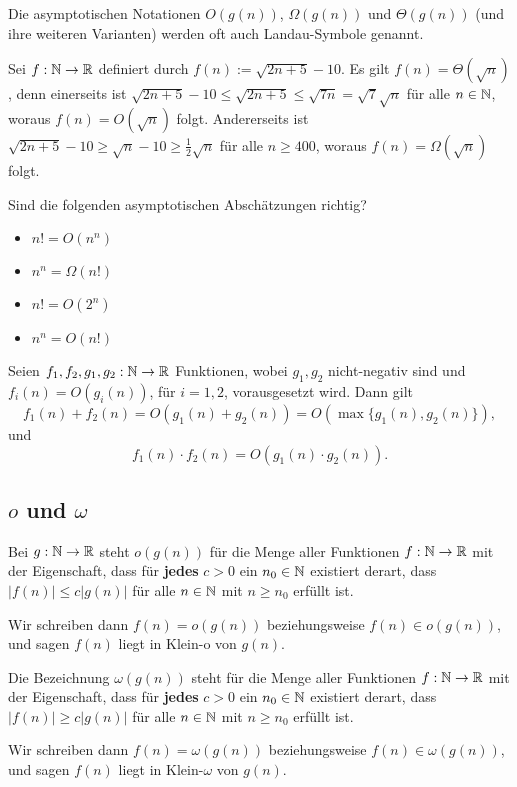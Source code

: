 \begin{bem}
Die asymptotischen Notationen $O(g(n))$, $\Omega(g(n))$ und $\Theta(g(n))$ (und ihre weiteren Varianten) werden oft auch Landau-Symbole genannt.
\end{bem} 

\begin{bsp}
	Sei $f : \mathbb{N} \to \mathbb{R}$ definiert durch $f(n):=\sqrt{2 n + 5 } - 10$. Es gilt $f(n) = \Theta(\sqrt{n})$, denn einerseits ist $\sqrt{2n + 5} - 10 \le \sqrt{2n + 5} \le \sqrt{ 7n} = \sqrt{7} \sqrt{n}$ für alle $n \in \mathbb{N}$, woraus $f(n) = O(\sqrt{n})$ folgt. Andererseits ist $\sqrt{2n + 5} - 10 \ge \sqrt{n} - 10 \ge \frac{1}{2} \sqrt{n}$ für alle $n \ge 400$, woraus $f(n) = \Omega(\sqrt{n})$ folgt.  
\end{bsp}

\begin{aufg}
	Sind die folgenden asymptotischen Abschätzungen richtig?
	\begin{itemize}
		\item $n! = O(n^n)$
		\item $n^n = \Omega(n!)$
		\item $n! = O(2^n)$
		\item $n^n = O(n!)$
	\end{itemize}
\end{aufg}


\begin{bem}
	Seien $f_1,f_2,g_1,g_2 : \mathbb{N} \to \mathbb{R}$ Funktionen, wobei $g_1,g_2$ nicht-negativ sind und $f_i(n) = O(g_i(n))$, für $i=1,2$, vorausgesetzt wird. Dann gilt
	\[
	f_1(n) + f_2(n) = O(g_1(n)+g_2(n)) = O(\max\{g_1(n),g_2(n)\}),
	\]
	und
	\[
	f_1(n) \cdot f_2(n) = O(g_1(n)\cdot g_2(n)).
	\]
\end{bem}

\subsection{$o$ und $\omega$}

\begin{defn}[$o$-Notation] 
Bei $g : \mathbb{N} \to \mathbb{R}$ steht $o(g(n))$ für die Menge aller Funktionen $f: \mathbb{N} \to \mathbb{R}$ mit der Eigenschaft, dass für \textbf{jedes} $c>0$ ein $n_0 \in \mathbb{N}$ existiert derart, dass $|f(n)| \le c |g(n)|$ für alle $n \in \mathbb{N}$ mit $n \ge n_0$ erfüllt ist.

Wir schreiben dann $f(n) = o(g(n))$ beziehungsweise $f(n) \in o(g(n))$, und sagen \glqq $f(n)$ liegt in Klein-o von $g(n)$\grqq.
\end{defn} 

\begin{defn}
Die Bezeichnung $\omega(g(n))$ steht für die Menge aller Funktionen $f : \mathbb{N} \to \mathbb{R}$ mit der Eigenschaft, dass für \textbf{jedes} $c>0$ ein $n_0 \in \mathbb{N}$ existiert derart, dass $|f(n)| \ge c|g(n)|$ für alle $n \in \mathbb{N}$ mit $n \ge n_0$ erfüllt ist.

Wir schreiben dann $f(n) = \omega(g(n))$ beziehungsweise $f(n) \in \omega(g(n))$, und sagen \glqq $f(n)$ liegt in Klein-$\omega$ von $g(n)$\grqq.
\end{defn} 
